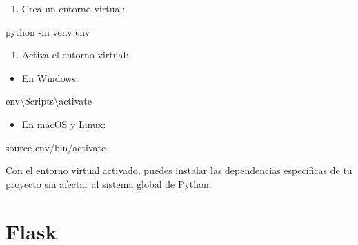 \documentclass[
  a4paper,
  DIV=11,
  numbers=noendperiod,
  onepage,
  openany]{scrreprt}
\newenvironment{Shaded}{\begin{snugshade}}{\end{snugshade}}
\newcommand{\AttributeTok}[1]{\textcolor[rgb]{0.40,0.45,0.13}{#1}}
\newcommand{\BuiltInTok}[1]{\textcolor[rgb]{0.00,0.23,0.31}{#1}}
\newcommand{\DataTypeTok}[1]{\textcolor[rgb]{0.68,0.00,0.00}{#1}}
\newcommand{\ExtensionTok}[1]{\textcolor[rgb]{0.00,0.23,0.31}{#1}}
\newcommand{\FunctionTok}[1]{\textcolor[rgb]{0.28,0.35,0.67}{#1}}
\newcommand{\NormalTok}[1]{\textcolor[rgb]{0.00,0.23,0.31}{#1}}
\providecommand{\tightlist}{%
  \setlength{\itemsep}{0pt}\setlength{\parskip}{0pt}}\usepackage{longtable,booktabs,array}
\begin{document}
\begin{enumerate}
\def\labelenumi{\arabic{enumi}.}
\setcounter{enumi}{1}
\tightlist
\item
  Crea un entorno virtual:
\end{enumerate}

\begin{Shaded}
\begin{Highlighting}[]
\ExtensionTok{python} \AttributeTok{{-}m}\NormalTok{ venv env}
\end{Highlighting}
\end{Shaded}

\begin{enumerate}
\def\labelenumi{\arabic{enumi}.}
\setcounter{enumi}{2}
\tightlist
\item
  Activa el entorno virtual:
\end{enumerate}

\begin{itemize}
\tightlist
\item
  En Windows:
\end{itemize}

\begin{Shaded}
\begin{Highlighting}[]
\FunctionTok{env}\DataTypeTok{\textbackslash{}S}\NormalTok{cripts}\DataTypeTok{\textbackslash{}a}\NormalTok{ctivate}
\end{Highlighting}
\end{Shaded}

\begin{itemize}
\tightlist
\item
  En macOS y Linux:
\end{itemize}

\begin{Shaded}
\begin{Highlighting}[]
\BuiltInTok{source}\NormalTok{ env/bin/activate}
\end{Highlighting}
\end{Shaded}

Con el entorno virtual activado, puedes instalar las dependencias
específicas de tu proyecto sin afectar al sistema global de Python.

\section{Flask}\label{flask}
\end{document}

